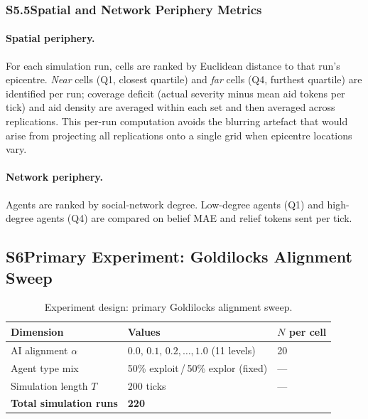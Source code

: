 \subsubsection*{S5.5\enspace Spatial and Network Periphery Metrics}

\paragraph{Spatial periphery.}
For each simulation run, cells are ranked by Euclidean distance to that run's
epicentre.
\emph{Near} cells (Q1, closest quartile) and \emph{far} cells (Q4, furthest
quartile) are identified per run; coverage deficit (actual severity minus mean
aid tokens per tick) and aid density are averaged within each set and then
averaged across replications.
This per-run computation avoids the blurring artefact that would arise from
projecting all replications onto a single grid when epicentre locations vary.

\paragraph{Network periphery.}
Agents are ranked by social-network degree.
Low-degree agents (Q1) and high-degree agents (Q4) are compared on belief MAE
and relief tokens sent per tick.

\subsection*{S6\quad Primary Experiment: Goldilocks Alignment Sweep}

\begin{table}[h]
\centering
\caption{Experiment design: primary Goldilocks alignment sweep.}
\label{tab:S6}
\begin{tabular}{lll}
\toprule
Dimension & Values & $N$ per cell \\
\midrule
AI alignment $\alpha$
  & $0.0,\,0.1,\,0.2,\ldots,1.0$ (11 levels) & 20 \\
Agent type mix
  & 50\% exploit\,/\,50\% explor (fixed) & --- \\
Simulation length $T$
  & 200 ticks & --- \\
\midrule
\textbf{Total simulation runs} & \multicolumn{2}{l}{\textbf{220}} \\
\bottomrule
\end{tabular}
\end{table}

